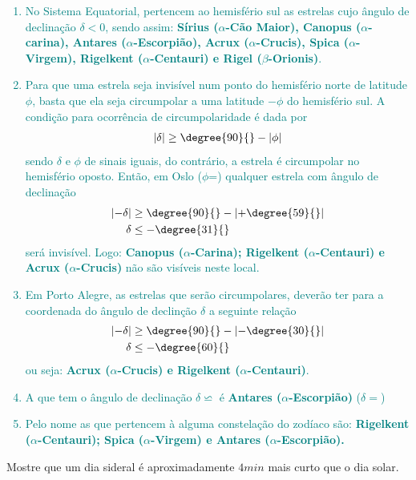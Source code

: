 \begin{sol}
	\textcolor{teal} {
		\begin{enumerate}[label=\alph *)]
			\item No Sistema Equatorial, pertencem ao hemisfério sul as estrelas cujo ângulo de declinação $\delta<0$, sendo assim:  \textbf{Sírius ($\alpha$-Cão Maior), Canopus ($\alpha$-carina), Antares ($\alpha$-Escorpião), Acrux ($\alpha$-Crucis), Spica ($\alpha$-Virgem), Rigelkent ($\alpha$-Centauri) e Rigel ($\beta$-Orionis)}.
			\item  Para que uma estrela seja invisível num ponto do hemisfério norte de latitude $\phi$, basta que ela seja circumpolar a uma latitude $-\phi$ do hemisfério sul. A condição para ocorrência de circumpolaridade é dada por 
			\begin{align}
				\left|\delta\right|\geq \degree{90}{}-\left|\phi\right|
			\end{align}
			sendo $\delta$ e $\phi$ de sinais iguais, do contrário, a estrela é circumpolar no hemisfério oposto. Então, em Oslo ($\phi$=) qualquer estrela com ângulo de declinação
			\begin{align}
				\left|-\delta\right|&\geq \degree{90}{}-\left|+\degree{59}{}\right| \nonumber \\
				\delta &\leq -\degree{31}{}
			\end{align}
			será invisível. Logo: \textbf{Canopus ($\alpha$-Carina); Rigelkent ($\alpha$-Centauri) e Acrux ($\alpha$-Crucis)} não são visíveis neste local.
			\item Em Porto Alegre, as estrelas que serão circumpolares, deverão ter para a coordenada do ângulo de declinção $\delta$ a seguinte relação
			\begin{align}
				\left|-\delta\right|&\geq\degree{90}{}-\left|-\degree{30}{}\right|\nonumber \\
				\delta&\leq-\degree{60}{}
			\end{align}
			ou seja: \textbf{Acrux ($\alpha$-Crucis) e  Rigelkent ($\alpha$-Centauri)}. 
			\item A que tem o ângulo de declinação $\delta \backsimeq$  é \textbf{Antares ($\alpha$-Escorpião)} ($\delta=$)
			\item Pelo nome as que pertencem à alguma constelação do zodíaco são: \textbf{Rigelkent ($\alpha$-Centauri); Spica ($\alpha$-Virgem) e Antares ($\alpha$-Escorpião).}
		\end{enumerate}
	}
\end{sol}
\begin{prob}
	Mostre que um dia sideral é aproximadamente $4min$ mais curto que o dia solar.
\end{prob}

